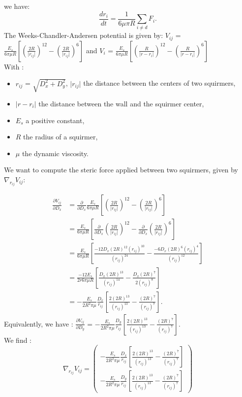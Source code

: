 \documentclass{article}
\begin{document}
we have:
$$\frac{dr_i}{dt} = \frac{1}{6\mu\pi R}\sum\limits_{i \ne d} F_i.$$
The Weeks-Chandler-Andersen potential is given by:
$V_{ij}$ = $\frac{E_s}{6\pi\mu R}\left[\left(\frac{2R}{\lvert r_{ij}\rvert}\right)^{12} - \left(\frac{2R}{\lvert r_{ij}\rvert}\right)^6\right]$ and  $V_i$ = $\frac{E_s}{6\pi\mu R} \left[ \left( \frac{R}{\lvert r - r_i \rvert} \right)^{12} - \left( \frac{R}{\lvert r - r_i \rvert} \right) ^6 \right]$ 
\vspace{0,3cm}
\\With : \begin{itemize}
    \item $r_{ij}$ = $\sqrt{D_x^2+D_y^2}$, $\lvert r_{ij} \rvert$ the distance between the centers of two squirmers,
    \item $\lvert r - r_i\rvert$ the distance between the wall and the squirmer center,
    \item $E_s$ a positive constant,
    \item $R$ the radius of a squirmer,
    \item $\mu$ the dynamic viscosity.
\end{itemize}

\vspace{0,5cm}
We want to compute the steric force applied between two squirmers, given by $\nabla_{r_{ij}} V_{ij}$:

\begin{align*}
\frac{\partial V_{ij}}{\partial D_x} &= \frac{\partial}{\partial D_x}\frac{E_s}{6\pi\mu R}\left[\left(\frac{2R}{\lvert r_{ij}\rvert}\right)^{12} - \left(\frac{2R}{\lvert r_{ij}\rvert}\right)^6\right] \\
&= \frac{E_s}{6\pi\mu R} \left[\frac{\partial}{\partial D_x}\left(\frac{2R}{\lvert r_{ij}\rvert}\right)^{12} - \frac{\partial}{\partial D_x} \left(\frac{2R}{\lvert r_{ij}\rvert}\right)^6\right] \\
&= \frac{E_s}{6\pi\mu R} \left[ \frac{-12 D_x (2R)^{12}(r_{ij})^{10}}{(r_{ij})^{24}} - \frac{-6D_x(2R)^6(r_{ij})^4}{(r_{ij})^{12}}  \right] \\
&= \frac{-12 E_s}{2r6\pi\mu R} \left[ \frac{D_x (2R)^{13}}{(r_{ij})^{14}} - \frac{D_x (2R)^{7}}{2(r_{ij})^8}\right] \\
&= -\frac{E_s}{2R^2\pi\mu} \frac{D_x}{r_{ij}} \left[ \frac{2(2R)^{13}}{(r_{ij})^{13}} - \frac{(2R)^7}{(r_{ij})^{7}}\right].
\end{align*}
Equivalently, we have : 
$\frac{\partial V_{ij}}{\partial D_y}$ = $-\frac{E_s}{2R^2\pi\mu} \frac{D_y}{r_{ij}}\left[ \frac{2(2R)^{13}}{(r_{ij})^{13}} - \frac{(2R)^7}{(r_{ij})^7} \right].$
\\ We find : 
\begin{equation*}
    \boxed{\nabla_{r_{ij}} V_{ij} = 
    \begin{pmatrix}
        -\frac{E_s}{2R^2\pi\mu} \frac{D_x}{r_{ij}}\left[ \frac{2(2R)^{13}}{(r_{ij})^{13}} - \frac{(2R)^7}{(r_{ij})^7} \right] \\
        -\frac{E_s}{2R^2\pi\mu} \frac{D_y}{r_{ij}}\left[ \frac{2(2R)^{13}}{(r_{ij})^{13}} - \frac{(2R)^7}{(r_{ij})^7} \right]
    \end{pmatrix}}
\end{equation*}
\end{document}
